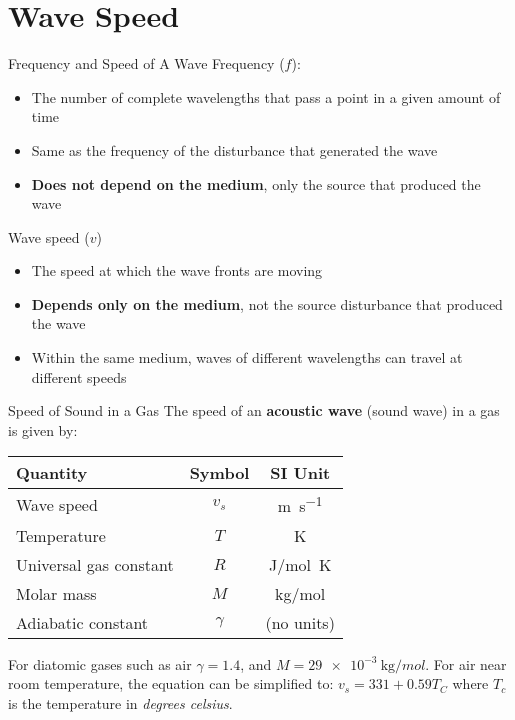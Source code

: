 \documentclass[12pt,aspectratio=169]{beamer}
\newcommand{\eq}[2]{\vspace{#1}{\Large\begin{displaymath}#2\end{displaymath}}}
\begin{document}
\section{Wave Speed}

\begin{frame}{Frequency and Speed of A Wave}
  Frequency ($f$):
  \begin{itemize}
  \item The number of complete wavelengths that pass a point in a given amount
    of time
  \item Same as the frequency of the disturbance that generated the wave
  \item\textbf{Does not depend on the medium}, only the source that produced
    the wave
  \end{itemize}

  \vspace{.2in}Wave speed ($v$)
  \begin{itemize}
  \item The speed at which the wave fronts are moving
  \item \textbf{Depends only on the medium}, not the source disturbance that
    produced the wave
  \item Within the same medium, waves of different wavelengths can travel
    at different speeds
  \end{itemize}
\end{frame}



\begin{frame}{Speed of Sound in a Gas}
  The speed of an \textbf{acoustic wave} (sound wave) in a gas is given by:
  
  \eq{-.2in}{
    \boxed{v_s=\sqrt{\frac{\gamma RT}M}}
  }
  \begin{center}
    \begin{tabular}{l|c|c}
      \rowcolor{pink}
      \textbf{Quantity} & \textbf{Symbol} & \textbf{SI Unit} \\ \hline
      Wave speed             & $v_s$    & \si{\metre\per\second}\\
      Temperature            & $T$      & \si{\kelvin}\\
      Universal gas constant & $R$      & \si{\joule/mol.\kelvin}\\
      Molar mass             & $M$      & \si{\kilo\gram/mol}\\
      Adiabatic constant     & $\gamma$ & (no units)
    \end{tabular}
  \end{center}
  For diatomic gases such as air $\gamma=1.4$, and
  $M=\SI{29e-3}{\kilo\gram/mol}$. For air near room temperature, the equation
  can be simplified to: $\boxed{v_s=331+0.59T_C}$ where $T_c$ is the
  temperature in \emph{degrees celsius}.
\end{frame}
\end{document}

